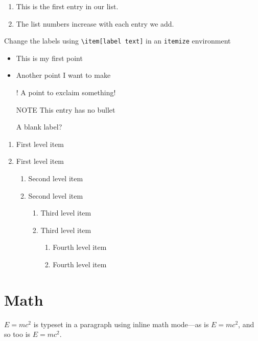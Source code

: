 \documentclass[12pt, a4paper]{article} %
\begin{document}
        \begin{enumerate}                                      %
            \item This is the first entry in our list.
            \item The list numbers increase with each entry we add.
        \end{enumerate}

        Change the labels using \verb|\item[label text]| in an \texttt{itemize} environment
        \begin{itemize}
            \item This is my first point
            \item Another point I want to make
            \item[!] A point to exclaim something!
            \item[NOTE] This entry has no bullet
            \item[] A blank label?
        \end{itemize}

        \begin{enumerate}
            \item First level item
            \item First level item

            \begin{enumerate}
                \item Second level item
                \item Second level item

                \begin{enumerate}
                    \item Third level item
                    \item Third level item

                    \begin{enumerate}
                        \item Fourth level item
                        \item Fourth level item
                    \end{enumerate}
                \end{enumerate}
            \end{enumerate}
        \end{enumerate}

    \section{Math}
        \begin{math}                                           %
            E=mc^2
        \end{math} is typeset in a paragraph using inline math mode---as is $E=mc^2$, and so too is \(E=mc^2\).
\end{document}
